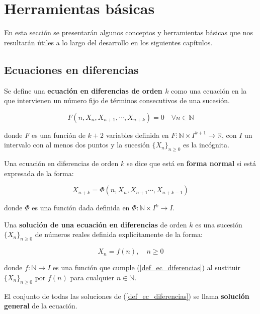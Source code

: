 
\chapter{Herramientas básicas}

En esta sección se presentarán algunos conceptos y herramientas básicas que nos resultarán útiles a lo largo del desarrollo en los siguientes capítulos.

\section{Ecuaciones en diferencias}

\begin{definition}
Se define una \textbf{ecuación en diferencias de orden $k$} como una ecuación en la que intervienen un número fijo de términos consecutivos de una sucesión.

\begin{equation}
\label{def_ec_diferencias}
F(n,X_n, X_{n+1}, \cdots , X_{n+k}) = 0 \quad \forall n\in\mathbb{N}
\end{equation}


donde $F$ es una función de $k+2$ variables definida en $F:\mathbb{N}\times I^{k+1}\rightarrow \mathbb{R}$, con $I$ un intervalo con al menos dos puntos y la sucesión $\{X_n\}_{n\geq 0}$ es la incógnita.
\end{definition}

\begin{definition}
Una ecuación en diferencias de orden $k$ se dice que está en \textbf{forma normal} si está expresada de la forma:

\begin{equation}
\label{def_ec_forma_normal}
X_{n+k} = \Phi (n, X_n, X_{n+1}\cdots , X_{n+k-1})
\end{equation}


donde $\Phi$ es una función dada definida en $\Phi :\mathbb{N}\times I^{k}\rightarrow I$.
\end{definition}

\begin{definition}
Una \textbf{solución de una ecuación en diferencias} de orden $k$ es una sucesión $\{X_n\}_{n\geq 0}$ de números reales definida explícitamente de la forma:

$$X_n = f(n),\quad n\geq 0$$

donde $f: \mathbb{N} \rightarrow I$ es una función que cumple (\ref{def_ec_diferencias}) al sustituir $\{X_n\}_{n\geq 0}$ por $f(n)$ para cualquier $n\in\mathbb{N}$.

El conjunto de todas las soluciones de (\ref{def_ec_diferencias}) se llama \textbf{solución general} de la ecuación.
\end{definition}

